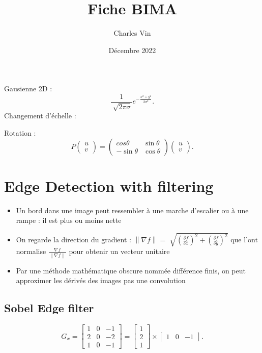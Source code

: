 \documentclass{article}
\title{Fiche BIMA}
\author{Charles Vin}
\date{Décembre 2022}
\theoremstyle{plain}%
\theoremstyle{definition}
\theoremstyle{remark}
\begin{document}
\maketitle
\tableofcontents
Gausienne 2D : 
\[
    \frac{1}{\sqrt[]{2 \pi \sigma }} e^{- \frac{x^2 + y^2}{2 \sigma ^2}}
.\]
Changement d'échelle : 

Rotation : 
\[
    P \begin{pmatrix}
        u \\
        v
    \end{pmatrix} = \begin{pmatrix}
        cos \theta & \sin \theta \\
        - \sin \theta & \cos \theta 
    \end{pmatrix} \begin{pmatrix}
        u \\
        v
    \end{pmatrix}
.\]


\section{Edge Detection with filtering}
\begin{itemize}
    \item Un bord dans une image peut ressembler à une marche d'escalier ou à une rampe : il est plus ou moins nette
    \item On regarde la direction du gradient : $ \left\| \nabla f \right\| = \sqrt[]{(\frac{\delta f}{\delta x})^2 + (\frac{\delta f}{\delta y})^2} $ que l'ont normalise $ \frac{\nabla f}{\left\| \nabla f \right\| } $ pour obtenir un vecteur unitaire
    \item Par une méthode mathématique obscure nommée différence finis, on peut approximer les dérivés des images pas une convolution 
\end{itemize}
\subsection{Sobel Edge filter}
\[
    G_x = \begin{bmatrix}
        1 & 0 & -1 \\
        2 & 0 & -2 \\
        1 & 0 & -1 
    \end{bmatrix} = \begin{bmatrix}
        1 \\
        2 \\
        1
    \end{bmatrix} \times \begin{bmatrix}
        1 & 0 & -1
    \end{bmatrix}
.\]
\end{document}

